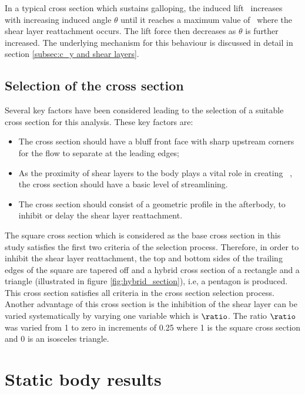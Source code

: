 In a typical cross section which sustains galloping, the induced lift \cy\ increases with increasing induced angle $\theta$ until it reaches a maximum value of \cy\ where the shear layer reattachment occurs. The lift force then decreases as $\theta$ is further increased. The underlying mechanism for this behaviour is discussed in detail in section \ref{subsec:c_y and shear layers}.   

\subsection*{Selection of the cross section}



Several key factors have been considered leading to the selection of a suitable cross section for this analysis. These key factors are:

\begin{itemize}
\item The cross section should have a bluff front face with sharp upstream corners for the flow to separate at the leading edges;

\item As the proximity of shear layers to the body plays a vital role in creating \cy\ \citep{Parkinson1989}, the cross section should have a basic level of streamlining.

\item The cross section should consist of a geometric profile in the afterbody, to inhibit or delay the shear layer reattachment.   
\end{itemize}

The square cross section which is considered as the base cross section in this study satisfies the first two criteria of the selection process. Therefore, in order to inhibit the shear layer reattachment, the top and bottom sides of the trailing edges of the square are tapered off and a hybrid cross section of a rectangle and a triangle (illustrated in figure \ref{fig:hybrid_section}), i.e, a pentagon is produced. This cross section satisfies all criteria in the cross section selection process. Another advantage of this cross section is the inhibition of the shear layer can be varied systematically by varying one variable which is $\ratio$. The ratio $\ratio$ was varied from 1 to zero in increments of 0.25 where 1 is the square cross section and 0 is an isosceles triangle. 


\section{Static body results}
\label{sec:cross-sec-Static body results}

